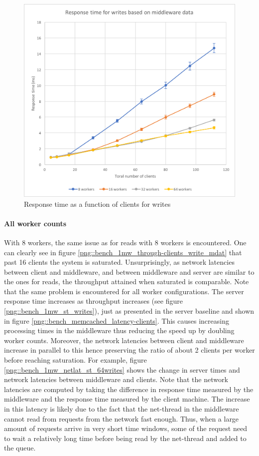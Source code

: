\documentclass[11pt,a4paper]{article}
\begin{document}
\begin{figure}[!h]
\begin{minipage}[b]{.45\textwidth}
        \includegraphics[width=\textwidth]{processing/graphics/bench_1mw_latency-clients_write_mdat.png}
        \caption{Response time as a function of clients for writes}
        \label{png::bench_1mw_latency-clients_write_mdat}
    \end{minipage}
\end{figure}

\paragraph{All worker counts}
With 8 workers, the same issue as for reads with 8 workers is encountered. One can clearly see in figure \ref{png::bench_1mw_through-clients_write_mdat} that past 16 clients the system is saturated. Unsurprisingly, as network latencies between client and middleware, and between middleware and server are similar to the ones for reads, the throughput attained when saturated is comparable. Note that the same problem is encountered for all worker configurations. The server response time increases as throughput increases (see figure \ref{png::bench_1mw_st_writes}), just as presented in the server baseline and shown in figure \ref{png::bench_memcached_latency-clients}. This causes increasing processing times in the middleware thus reducing the speed up by doubling worker counts. Moreover, the network latencies between client and middleware increase in parallel to this hence preserving the ratio of about 2 clients per worker before reaching saturation. For example, figure \ref{png::bench_1mw_netlat_st_64writes} shows the change in server times and network latencies between middleware and clients. Note that the network latencies are computed by taking the difference in response time measured by the middleware and the response time measured by the client machine. The increase in this latency is likely due to the fact that the net-thread in the middleware cannot read from requests from the network fast enough. Thus, when a large amount of requests arrive in very short time windows, some of the request need to wait a relatively long time before being read by the net-thread and added to the queue.
\end{document}
